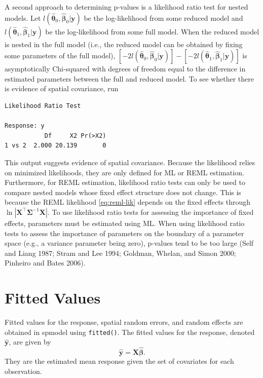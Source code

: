 \documentclass{article}
\begin{document}
A second approach to determining p-values is a likelihood ratio test for
nested models. Let
\(l(\bm{\hat{\theta}}_0, \bm{\hat{\beta}}_0 | \mathbf{y} )\) be the
log-likelihood from some reduced model and
\(l(\bm{\hat{\theta}}_1, \bm{\hat{\beta}}_1 | \mathbf{y} )\) be the
log-likelihood from some full model. When the reduced model is nested in
the full model (i.e., the reduced model can be obtained by fixing some
parameters of the full model),
\([-2l(\bm{\hat{\theta}}_0, \bm{\hat{\beta}}_0 | \mathbf{y} )] - [-2l(\bm{\hat{\theta}}_1, \bm{\hat{\beta}}_1 | \mathbf{y} )]\)
is asymptotically Chi-squared with degrees of freedom equal to the
difference in estimated parameters between the full and reduced model.
To see whether there is evidence of spatial covariance, run

\begin{verbatim}
Likelihood Ratio Test

Response: y
           Df     X2 Pr(>X2)
1 vs 2  2.000 20.139       0
\end{verbatim}

This output suggests evidence of spatial covariance. Because the
likelihood relies on minimized likelihoods, they are only defined for ML
or REML estimation. Furthermore, for REML estimation, likelihood ratio
tests can only be used to compare nested models whose fixed effect
structure does not change. This is because the REML likelihood
\eqref{eq:reml-lik} depends on the fixed effects through
\(\ln{|\mathbf{X}^\intercal \mathbf{\Sigma}^{-1} \mathbf{X}|}\). To use
likelihood ratio tests for assessing the importance of fixed effects,
parameters must be estimated using ML. When using likelihood ratio tests
to assess the importance of parameters on the boundary of a parameter
space (e.g., a variance parameter being zero), p-values tend to be too
large (Self and Liang 1987; Stram and Lee 1994; Goldman, Whelan, and
Simon 2000; Pinheiro and Bates 2006).

\hypertarget{fitted-values}{%
\section{Fitted Values}\label{fitted-values}}

Fitted values for the response, spatial random errors, and random
effects are obtained in spmodel using \texttt{fitted()}. The fitted
values for the response, denoted \(\mathbf{\hat{y}}\), are given by
\begin{equation}\label{eq:fit_resp}
  \mathbf{\hat{y}} = \mathbf{X} \bm{\hat{\beta}} .
\end{equation} They are the estimated mean response given the set of
covariates for each observation.
\end{document}
